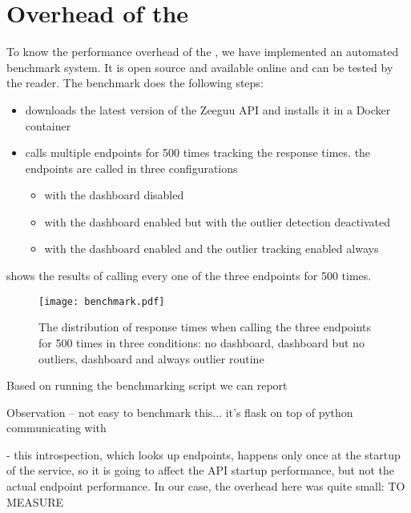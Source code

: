   

\section{Overhead of the \tool}
\label{sec:overhead}

To know the performance overhead of the \tool, we have implemented an automated benchmark system. It is open source and available online and can be tested by the reader. The benchmark does the following steps: 

\begin{itemize}
	\item downloads the latest version of the Zeeguu API and installs it in a Docker container
	\item calls multiple endpoints for 500 times tracking the response times. the endpoints are called in three configurations
	\begin{itemize}
		\item with the dashboard disabled
		\item with the dashboard enabled but with the outlier detection deactivated
		\item with the dashboard enabled and the outlier tracking enabled always
	\end{itemize}
\end{itemize}

 shows the results of calling every one of the three endpoints for 500 times. 


\begin{figure}[h!]
	\centering
	\texttt{[image: benchmark.pdf]}
	\caption{The distribution of response times when calling the three endpoints for 500 times in three conditions: no dashboard, dashboard but no outliers, dashboard and always outlier routine}
	\label{fig:bench}
\end{figure}

Based on running the benchmarking script we can report 

Observation -- not easy to benchmark this... it's flask on top of python communicating with 

- this introspection, which looks up endpoints, happens only once at the startup of the service, so it is going to affect the API startup performance, but not the actual endpoint performance. In our case, the overhead here was quite small: TO MEASURE


  